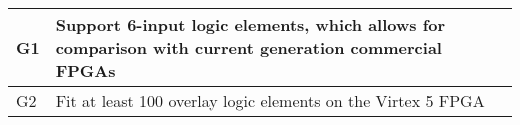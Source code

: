 \begin{tabular}{|p{1cm}|p{15cm}|}
\hline
G1 & Support 6-input logic elements, which allows for comparison with current generation commercial FPGAs\\ \hline
G2 & Fit at least 100 overlay logic elements on the Virtex 5 FPGA \\ \hline
\end{tabular}





